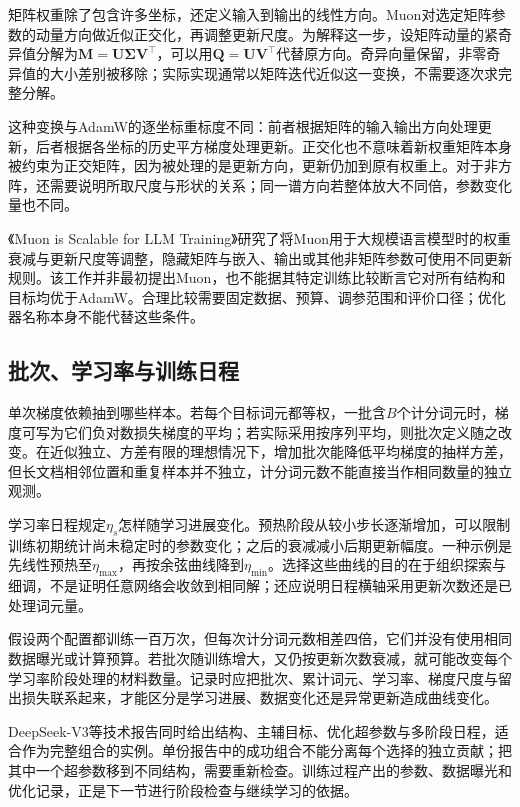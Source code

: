 矩阵权重除了包含许多坐标，还定义输入到输出的线性方向。Muon对选定矩阵参数的动量方向做近似正交化，再调整更新尺度。为解释这一步，设矩阵动量的紧奇异值分解为$\bm M=\bm U\bm\Sigma\bm V^{\top}$，可以用$\bm Q=\bm U\bm V^{\top}$代替原方向。奇异向量保留，非零奇异值的大小差别被移除；实际实现通常以矩阵迭代近似这一变换，不需要逐次求完整分解。

这种变换与AdamW的逐坐标重标度不同：前者根据矩阵的输入输出方向处理更新，后者根据各坐标的历史平方梯度处理更新。正交化也不意味着新权重矩阵本身被约束为正交矩阵，因为被处理的是更新方向，更新仍加到原有权重上。对于非方阵，还需要说明所取尺度与形状的关系；同一谱方向若整体放大不同倍，参数变化量也不同。

《Muon is Scalable for LLM Training》研究了将Muon用于大规模语言模型时的权重衰减与更新尺度等调整，隐藏矩阵与嵌入、输出或其他非矩阵参数可使用不同更新规则。该工作并非最初提出Muon，也不能据其特定训练比较断言它对所有结构和目标均优于AdamW。合理比较需要固定数据、预算、调参范围和评价口径；优化器名称本身不能代替这些条件。

\subsection{批次、学习率与训练日程}
\label{sec:nlp-llm-training-schedule}

单次梯度依赖抽到哪些样本。若每个目标词元都等权，一批含$B$个计分词元时，梯度可写为它们负对数损失梯度的平均；若实际采用按序列平均，则批次定义随之改变。在近似独立、方差有限的理想情况下，增加批次能降低平均梯度的抽样方差，但长文档相邻位置和重复样本并不独立，计分词元数不能直接当作相同数量的独立观测。

学习率日程规定$\eta_s$怎样随学习进展变化。预热阶段从较小步长逐渐增加，可以限制训练初期统计尚未稳定时的参数变化；之后的衰减减小后期更新幅度。一种示例是先线性预热至$\eta_{\max}$，再按余弦曲线降到$\eta_{\min}$。选择这些曲线的目的在于组织探索与细调，不是证明任意网络会收敛到相同解；还应说明日程横轴采用更新次数还是已处理词元量。

假设两个配置都训练一百万次，但每次计分词元数相差四倍，它们并没有使用相同数据曝光或计算预算。若批次随训练增大，又仍按更新次数衰减，就可能改变每个学习率阶段处理的材料数量。记录时应把批次、累计词元、学习率、梯度尺度与留出损失联系起来，才能区分是学习进展、数据变化还是异常更新造成曲线变化。

DeepSeek-V3等技术报告同时给出结构、主辅目标、优化超参数与多阶段日程，适合作为完整组合的实例。单份报告中的成功组合不能分离每个选择的独立贡献；把其中一个超参数移到不同结构，需要重新检查。训练过程产出的参数、数据曝光和优化记录，正是下一节进行阶段检查与继续学习的依据。
